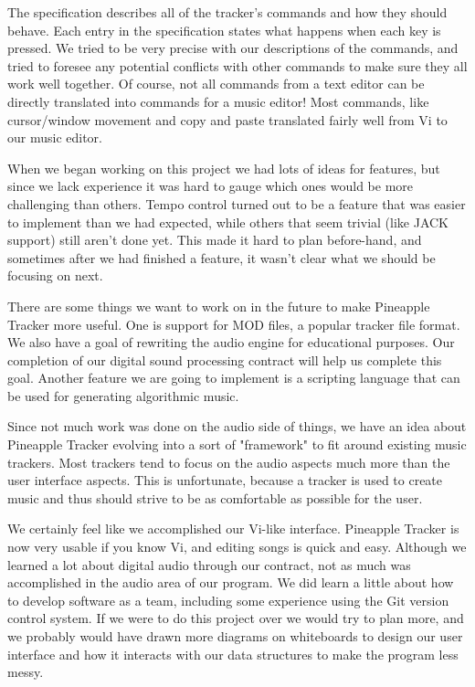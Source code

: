 \documentclass[12pt,letterpaper]{article}
\begin{document}
\par
The specification describes all of the tracker's commands and how they should behave.
Each entry in the specification states what happens when each key is pressed.
We tried to be very precise with our descriptions of the commands, and tried to foresee any potential conflicts with other commands to make sure they all work well together.
Of course, not all commands from a text editor can be directly translated into commands for a music editor!
Most commands, like cursor/window movement and copy and paste translated fairly well from Vi to our music editor.

\par
When we began working on this project we had lots of ideas for features, but since we lack experience it was hard to gauge which ones would be more challenging than others.
Tempo control turned out to be a feature that was easier to implement than we had expected, while others that seem trivial (like JACK support) still aren't done yet.
This made it hard to plan before-hand, and sometimes after we had finished a feature, it wasn't clear what we should be focusing on next.

\par
There are some things we want to work on in the future to make Pineapple Tracker more useful.
One is support for MOD files, a popular tracker file format.
We also have a goal of rewriting the audio engine for educational purposes.
Our completion of our digital sound processing contract will help us complete this goal.
Another feature we are going to implement is a scripting language that can be used for generating algorithmic music.

\par
Since not much work was done on the audio side of things, we have an idea about Pineapple Tracker evolving into a sort of "framework" to fit around existing music trackers.
Most trackers tend to focus on the audio aspects much more than the user interface aspects.
This is unfortunate, because a tracker is used to create music and thus should strive to be as comfortable as possible for the user.

\par
We certainly feel like we accomplished our Vi-like interface.
Pineapple Tracker is now very usable if you know Vi, and editing songs is quick and easy.
Although we learned a lot about digital audio through our contract, not as much was accomplished in the audio area of our program.
We did learn a little about how to develop software as a team, including some experience using the Git version control system.
If we were to do this project over we would try to plan more, and we probably would have drawn more diagrams on whiteboards to design our user interface and how it interacts with our data structures to make the program less messy.
\end{document}
